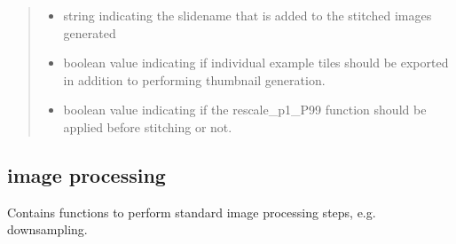 \documentclass[a4paper,10pt,english,openany,oneside]{sphinxmanual}
\begin{document}
\begin{fulllineitems}
\begin{quote}
\begin{description}
\begin{itemize}
\item {} 
\sphinxAtStartPar
{} \textendash{} string indicating the slidename that is added to the stitched images generated

\item {} 
\sphinxAtStartPar
{} \textendash{} boolean value indicating if individual example tiles should be exported in addition to performing thumbnail generation.

\item {} 
\sphinxAtStartPar
{} \textendash{} boolean value indicating if the rescale\_p1\_P99 function should be applied before stitching or not.

\end{itemize}

\end{description}\end{quote}

\end{fulllineitems}

\label{\detokenize{pages/modules:module-sparcstools.image_processing}}

\subsection{image processing}
\label{\detokenize{pages/modules:image-processing}}
\sphinxAtStartPar
Contains functions to perform standard image processing steps, e.g. downsampling.
\end{document}
